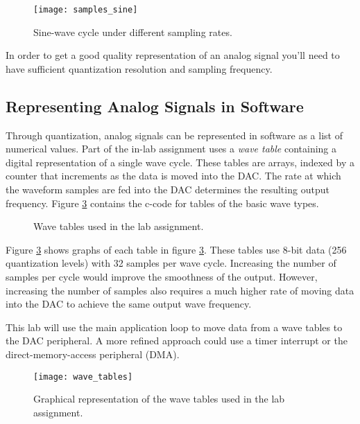 \documentclass[11pt,fleqn]{book} %
\newcommand{\code}[3]{
    \begin{figure}[]
        \colorbox{gray!20!white}{
            \parbox{\linewidth-2\fboxsep} {
                \centering 
                
            }
        }
        \caption{#2}
        \label{#3}
    \end{figure}
}
\begin{document}
\begin{figure}[]
    \centering\texttt{[image: samples\_sine]}
    \caption{Sine-wave cycle under different sampling rates.}
    \label{samples_sine}
\end{figure}

 In order to get a good quality representation of an analog signal you'll need to have sufficient quantization resolution and sampling frequency. 
 
\subsection{Representing Analog Signals in Software} 
 Through quantization, analog signals can be represented in software as a list of numerical values. Part of the in-lab assignment uses a \textit{wave table} containing a digital representation of a single wave cycle. These tables are arrays, indexed by a counter that increments as the data is moved into the DAC. The rate at which the waveform samples are fed into the DAC determines the resulting output frequency. Figure \ref{wave_tables} contains the c-code for tables of the basic wave types.
 
 
%         
% 
 
\code{./Files/wave_tables.c}{Wave tables used in the lab assignment.}{wave_tables}
 
Figure \ref{wave_tables} shows graphs of each table in figure \ref{wave_tables}. These tables use 8-bit data (256 quantization levels) with 32 samples per wave cycle. Increasing the number of samples per cycle would improve the smoothness of the output. However, increasing the number of samples also requires a much higher rate of moving data into the DAC to achieve the same output wave frequency. 

This lab will use the main application loop to move data from a wave tables to the DAC peripheral. A more refined approach could use a timer interrupt or the direct-memory-access peripheral (DMA). 

\begin{figure}[]
    \centering\texttt{[image: wave\_tables]}
    \caption{Graphical representation of the wave tables used in the lab assignment.}
    \label{wave_tables}
\end{figure}
 
\end{document}
